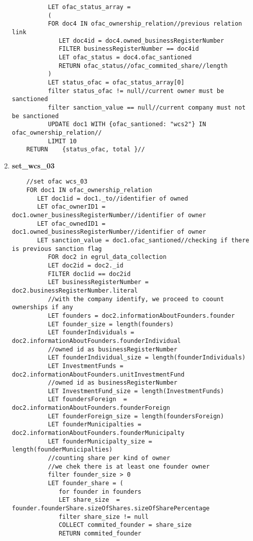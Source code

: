 \begin{enumerate}
\begin{verbatim}
	      LET ofac_status_array = 
	      (
	      FOR doc4 IN ofac_ownership_relation//previous relation link
	         LET doc4id = doc4.owned_businessRegisterNumber
	         FILTER businessRegisterNumber == doc4id
	         LET ofac_status = doc4.ofac_santioned
	         RETURN ofac_status//ofac_commited_share//length
	      )
	      LET status_ofac = ofac_status_array[0]
	      filter status_ofac != null//current owner must be sanctioned
	      filter sanction_value == null//current company must not be sanctioned
	      UPDATE doc1 WITH {ofac_santioned: "wcs2"} IN ofac_ownership_relation//
	      LIMIT 10
	RETURN    {status_ofac, total }//
	\end{verbatim}
	
	\item \textbf{set\_wcs\_03}\label{query13}
	\begin{verbatim}
	//set ofac wcs_03
	FOR doc1 IN ofac_ownership_relation
	   LET doc1id = doc1._to//identifier of owned
	   LET ofac_ownerID1 = doc1.owner_businessRegisterNumber//identifier of owner
	   LET ofac_ownedID1 = doc1.owned_businessRegisterNumber//identifier of owner
	   LET sanction_value = doc1.ofac_santioned//checking if there is previous sanction flag
	      FOR doc2 in egrul_data_collection
	      LET doc2id = doc2._id
	      FILTER doc1id == doc2id
	      LET businessRegisterNumber = doc2.businessRegisterNumber.literal
	      //with the company identify, we proceed to coount ownerships if any
	      LET founders = doc2.informationAboutFounders.founder
	      LET founder_size = length(founders)
	      LET founderIndividuals = doc2.informationAboutFounders.founderIndividual
	      //owned id as businessRegisterNumber
	      LET founderIndividual_size = length(founderIndividuals)
	      LET InvestmentFunds = doc2.informationAboutFounders.unitInvestmentFund
	      //owned id as businessRegisterNumber
	      LET InvestmentFund_size = length(InvestmentFunds)
	      LET foundersForeign  = doc2.informationAboutFounders.founderForeign
	      LET founderForeign_size = length(foundersForeign)
	      LET founderMunicipalties = doc2.informationAboutFounders.founderMunicipalty
	      LET founderMunicipalty_size = length(founderMunicipalties)
	      //counting share per kind of owner
	      //we chek there is at least one founder owner 
	      filter founder_size > 0
	      LET founder_share = (
	         for founder in founders
	         LET share_size  = founder.founderShare.sizeOfShares.sizeOfSharePercentage
	         filter share_size != null
	         COLLECT commited_founder = share_size
	         RETURN commited_founder

\end{verbatim}
\end{enumerate}
